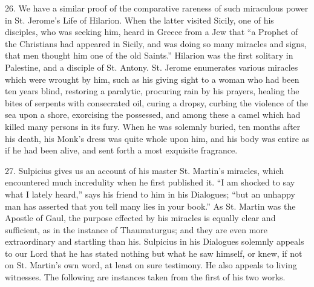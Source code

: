 26.
We have a similar proof of the comparative rareness of such miraculous
power in St. Jerome's Life of Hilarion. When the latter visited
Sicily, one of his disciples, who was seeking him, heard in Greece
from a Jew that ``a Prophet of the Christians had appeared in Sicily,
and was doing so many miracles and signs, that men thought him one of
the old Saints.'' Hilarion was the first solitary in Palestine, and a
disciple of St. Antony. St. Jerome enumerates various miracles which
were wrought by him, such as his giving sight to a woman who had been
ten years blind, restoring a paralytic, procuring rain by his prayers,
healing the bites of serpents with consecrated oil, curing a dropsy,
curbing the violence of the sea upon a shore, exorcising the
possessed, and among these a camel which had killed many persons in
its fury. When he was solemnly buried, ten months after his death, his
Monk's dress was quite whole upon him, and his body was entire as if
he had been alive, and sent forth a most exquisite fragrance.

27.
Sulpicius gives us an account of his master St. Martin's miracles,
which encountered much incredulity when he first published it. ``I am
shocked to say what I lately heard,'' says his friend to him in his
Dialogues; ``but an unhappy man has asserted that you tell many lies in
your book.'' As St. Martin was the Apostle of Gaul, the purpose
effected by his miracles is equally clear and sufficient, as in the
instance of Thaumaturgus; and they are even more extraordinary and
startling than his. Sulpicius in his Dialogues solemnly appeals to our
Lord that he has stated nothing but what he saw himself, or knew, if
not on St. Martin's own word, at least on sure testimony. He also
appeals to living witnesses. The following are instances taken from
the first of his two works.


